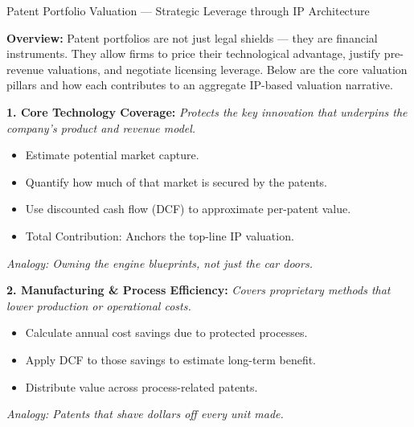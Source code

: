 \medskip

\begin{TechnicalSidebar}{Patent Portfolio Valuation --- Strategic Leverage through IP Architecture}

    \textbf{Overview:}  
    Patent portfolios are not just legal shields — they are financial instruments. They allow firms to price 
    their technological advantage, justify pre-revenue valuations, and negotiate licensing leverage. Below 
    are the core valuation pillars and how each contributes to an aggregate IP-based valuation narrative.
    
    \medskip
    
    \textbf{1. Core Technology Coverage:}  
    \textit{Protects the key innovation that underpins the company’s product and revenue model.}

    \medskip

    \begin{itemize}
      \item Estimate potential market capture.
      \item Quantify how much of that market is secured by the patents.
      \item Use discounted cash flow (DCF) to approximate per-patent value.
      \item Total Contribution: Anchors the top-line IP valuation.
    \end{itemize}

    \medskip


    \textit{Analogy: Owning the engine blueprints, not just the car doors.}
    
    \medskip
    
    \textbf{2. Manufacturing \& Process Efficiency:}  
    \textit{Covers proprietary methods that lower production or operational costs.}

    \medskip
    \begin{itemize}
      \item Calculate annual cost savings due to protected processes.
      \item Apply DCF to those savings to estimate long-term benefit.
      \item Distribute value across process-related patents.
    \end{itemize}

    \medskip

    \textit{Analogy: Patents that shave dollars off every unit made.}
    
    \medskip
    

\end{TechnicalSidebar}
